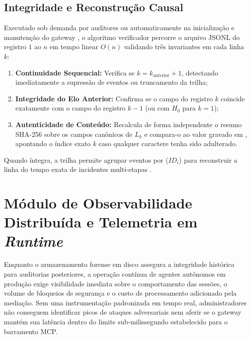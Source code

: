 \subsection{Integridade e Reconstrução Causal}
\label{subsec:verificador_forense}

Executado sob demanda por auditores ou automaticamente na inicialização e manutenção do gateway \cite{hou2025mcp,jang2026hierarchical}, o algoritmo verificador percorre o arquivo JSONL do registro $1$ ao $n$ em tempo linear $O(n)$ validando três invariantes em cada linha $k$:
\begin{enumerate}
  \item \textbf{Continuidade Sequencial:} Verifica se $k = k_{\text{anterior}} + 1$, detectando imediatamente a supressão de eventos ou truncamento da trilha;
  \item \textbf{Integridade do Elo Anterior:} Confirma se o campo  do registro $k$ coincide exatamente com o campo  do registro $k-1$ (ou com $H_0$ para $k=1$);
  \item \textbf{Autenticidade de Conteúdo:} Recalcula de forma independente o resumo SHA-256 sobre os campos canônicos de $L_k$ e compara-o ao valor gravado em , apontando o índice exato $k$ caso qualquer caractere tenha sido adulterado.
\end{enumerate}
Quando íntegra, a trilha permite agrupar eventos por  ($ID_i$) para reconstruir a linha do tempo exata de incidentes multi-etapas \cite{singh2026mcpsecure}.

\section{Módulo de Observabilidade Distribuída e Telemetria em \textit{Runtime}}
\label{sec:modulo_observabilidade}

Enquanto o armazenamento forense em disco assegura a integridade histórica para auditorias posteriores, a operação contínua de agentes autônomos em produção exige visibilidade imediata sobre o comportamento das sessões, o volume de bloqueios de segurança e o custo de processamento adicionado pela mediação. Sem uma instrumentação padronizada em tempo real, administradores não conseguem identificar picos de ataques adversariais nem aferir se o gateway mantém sua latência dentro do limite sub-milissegundo estabelecido para o barramento MCP.

